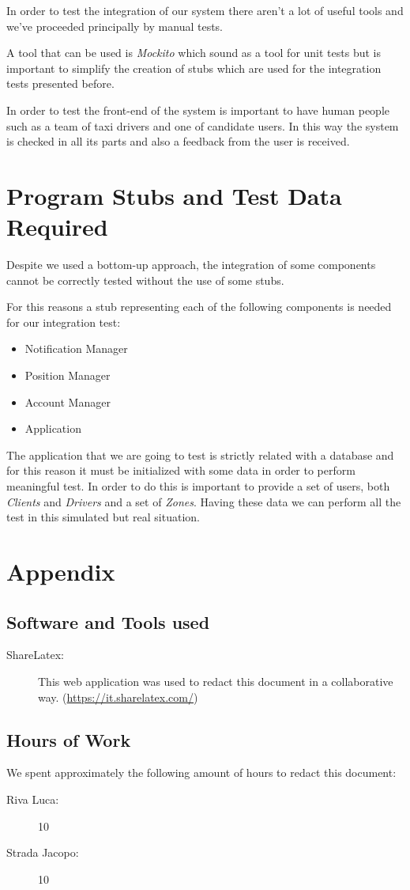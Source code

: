 \documentclass[a4paper]{article}
\begin{document}
In order to test the integration of our system there aren't a lot of useful tools and we've proceeded principally by manual tests.

A tool that can be used is \emph{Mockito} which sound as a tool for unit tests but is important to simplify the creation of stubs which are used for the integration tests presented before.

In order to test the front-end of the system is important to have human people such as a team of taxi drivers and one of candidate users. In this way the system is checked in all its parts and also a feedback from the user is received.

\section{Program Stubs and Test Data Required}

Despite we used a bottom-up approach, the integration of some components cannot be correctly tested without the use of some stubs.

For this reasons a stub representing each of the following components is needed for our integration test:
\begin{itemize}
    \item Notification Manager
    \item Position Manager
    \item Account Manager
    \item Application
\end{itemize}

The application that we are going to test is strictly related with a database and for this reason it must be initialized with some data in order to perform meaningful test. In order to do this is important to provide a set of users, both \textit{Clients} and \textit{Drivers} and a set of \textit{Zones}. Having these data we can perform all the test in this simulated but real situation.

\section{Appendix}

\subsection{Software and Tools used}

\begin{description}
\item[ShareLatex:] This web application was used to redact this document in a collaborative way. 
\newline (\url{https://it.sharelatex.com/})
\end{description}

\subsection{Hours of Work}
We spent approximately the following amount of hours to redact this document:
\begin{description}
\item[Riva Luca:] 10
\item[Strada Jacopo:] 10
\end{description}
\end{document}
